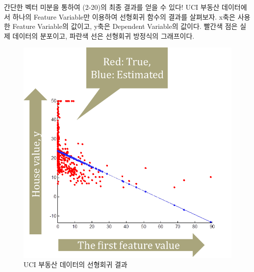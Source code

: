 \documentclass[a4paper]{oblivoir}
\begin{document}
\indent 간단한 벡터 미분을 통하여 (2-20)의 최종 결과를 얻을 수 있다! UCI 부동산 데이터에서 하나의 Feature Variable만 이용하여 선형회귀 함수의 결과를 살펴보자. x축은 사용한 Feature Variable의 값이고, y축은 Dependent Variable의 값이다. 빨간색 점은 실제 데이터의 분포이고, 파란색 선은 선형회귀 방정식의 그래프이다.
\begin{figure}[ht]
\centering
\includegraphics[scale=0.6]{Linear_Regression.png}
\caption{UCI 부동산 데이터의 선형회귀 결과}
\label{Figure 2-18}
\end{figure}

\end{document}
